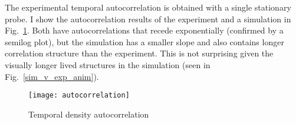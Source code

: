 The experimental temporal autocorrelation is obtained with a single stationary probe. I show the autocorrelation results of the experiment and a simulation in Fig.~\ref{autocorrelation}. 
Both have autocorrelations that recede exponentially (confirmed by a semilog plot), but the simulation has a smaller slope and also contains longer correlation structure than the experiment. This is not
surprising given the visually longer lived structures in the simulation (seen in Fig.~\ref{sim_v_exp_anim}).

\begin{figure}
\centerline{\texttt{[image: autocorrelation]}}
\caption{Temporal density autocorrelation}
\label{autocorrelation}
\end{figure}
